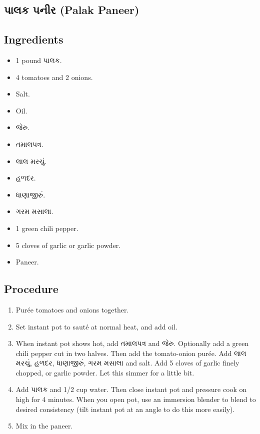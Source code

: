 \documentclass[../../recipes.tex]{subfiles}
\begin{document}
\begin{gujarati}

\chapter{પાલક પનીર (Palak Paneer)}

\section*{Ingredients}

\begin{itemize}
    \item 1 pound પાલક.
    \item 4 tomatoes and 2 onions.
    \item Salt.
    \item Oil.
    \item જેરુ.
    \item તમાલપત્ર.
    \item લાલ મરચું.
    \item હળદર.
    \item ધાણાજીરું.
    \item ગરમ મસાલા.
    \item 1 green chili pepper.
    \item 5 cloves of garlic or garlic powder.
    \item Paneer.
\end{itemize}

\noindent
\section*{Procedure}

\begin{enumerate}
    \item Purée tomatoes and onions together.
    \item Set instant pot to sauté at normal heat, and add oil.
    \item When instant pot shows hot, add તમાલપત્ર and જેરુ. Optionally add a green chili pepper cut in two halves. Then add the tomato-onion purée. Add લાલ મરચું, હળદર, ધાણાજીરું, ગરમ મસાલા and salt. Add 5 cloves of garlic finely chopped, or garlic powder. Let this simmer for a little bit.
    \item Add પાલક and 1/2 cup water. Then close instant pot and pressure cook on high for 4 minutes. When you open pot, use an immersion blender to blend to desired consistency (tilt instant pot at an angle to do this more easily).
    \item Mix in the paneer.
\end{enumerate}

\end{gujarati}
\end{document}
